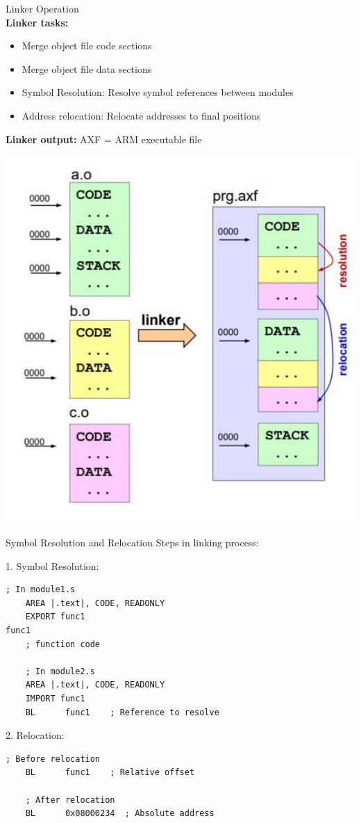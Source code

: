 \begin{concept}{Linker Operation}\\
\textbf{Linker tasks:}
\begin{itemize}
  \item Merge object file code sections
  \item Merge object file data sections
  \item Symbol Resolution: Resolve symbol references between modules
  \item Address relocation: Relocate addresses to final positions
\end{itemize}

\textbf{Linker output:} AXF = ARM executable file

\includegraphics[width=0.8\linewidth]{images/2024_12_29_79e6b22f503fb7b4f718g-10}
\end{concept}

\begin{KR}{Symbol Resolution and Relocation}
Steps in linking process:

1. Symbol Resolution:
\begin{lstlisting}[language=armasm, style=basesmol]
    ; In module1.s
    AREA |.text|, CODE, READONLY
    EXPORT func1
func1
    ; function code
    
    ; In module2.s
    AREA |.text|, CODE, READONLY
    IMPORT func1
    BL      func1    ; Reference to resolve
\end{lstlisting}

2. Relocation:
\begin{lstlisting}[language=armasm, style=basesmol]
    ; Before relocation
    BL      func1    ; Relative offset
    
    ; After relocation
    BL      0x08000234  ; Absolute address
\end{lstlisting}
\end{KR}

